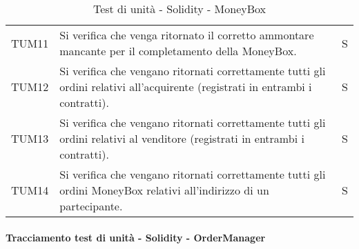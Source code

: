 \begin{table}[H]
\begin{tabular}{c|p{10cm}|c}
    TUM11 & Si verifica che venga ritornato il corretto ammontare mancante per il completamento della MoneyBox\glo{}.                      & S \\
    TUM12 & Si verifica che vengano ritornati correttamente tutti gli ordini relativi all'acquirente (registrati in entrambi i contratti). & S \\
    TUM13 & Si verifica che vengano ritornati correttamente tutti gli ordini relativi al venditore (registrati in entrambi i contratti).   & S \\
    TUM14 & Si verifica che vengano ritornati correttamente tutti gli ordini MoneyBox\glo{} relativi all'indirizzo di un partecipante.     & S \\
  \end{tabular}
  \caption{Test di unità - Solidity - MoneyBox}
\end{table}



\paragraph{Tracciamento test di unità - Solidity - OrderManager}\label{paragraph:tracciamento_TUM}

